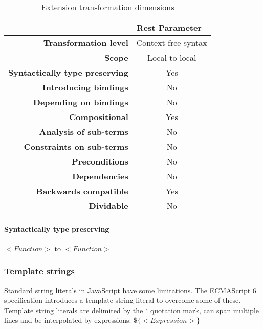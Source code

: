 \documentclass[10pt,a4paper]{article}
\begin{document}
\begin{table}[H]
\centering
\caption{Extension transformation dimensions}
\label{rest-parameter-table}
\begin{tabular}{@{}rc@{}}
\toprule
                                       & \multicolumn{1}{l}{\textbf{Rest Parameter}} \\ \midrule
\textbf{Transformation level}          & Context-free syntax                          \\
\textbf{Scope}                         & Local-to-local                               \\
\textbf{Syntactically type preserving} & Yes                                          \\
\textbf{Introducing bindings}          & No                                          \\%
\textbf{Depending on bindings}         & No                                           \\
\textbf{Compositional}                 & Yes                                          \\
\textbf{Analysis of sub-terms}          & No                                          \\
\textbf{Constraints on sub-terms}       & No                                           \\
\textbf{Preconditions}                 & No                                          \\
\textbf{Dependencies}                  & No                                           \\
\textbf{Backwards compatible}          & Yes                                          \\
\textbf{Dividable}                     & No                                           \\ \bottomrule
\end{tabular}
\end{table}

\paragraph{Syntactically type preserving}
$<Function>$ to $<Function>$

\subsubsection{Template strings}
Standard string literals in JavaScript have some limitations. The ECMAScript 6 specification introduces a template string literal to overcome some of these\cite[12.2.8]{SpecJS}. Template string literals are delimited by the $`$ quotation mark, can span multiple lines and be interpolated by expressions: $\$\{<Expression>\}$
\end{document}
